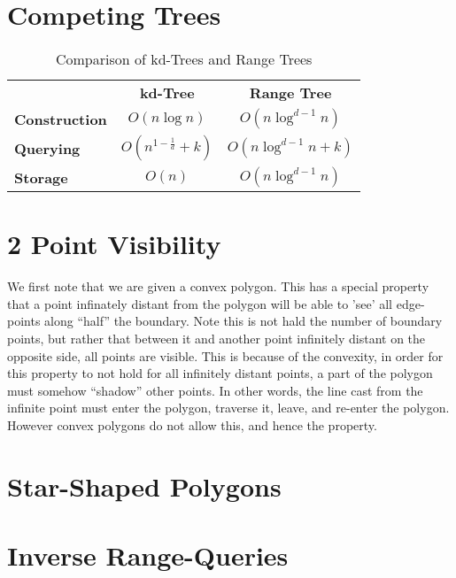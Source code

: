 \section {Competing Trees}
\begin{table}
\caption{Comparison of kd-Trees and Range Trees}
\centering
\begin{tabular}{l c c}
\hline
& \textbf{kd-Tree} & \textbf{Range Tree} \\
\textbf{Construction} & $O(n\log n)$ &  $O(n\log^{d-1}n)$ \\
\textbf{Querying} & $O(n^{1-\frac{1}{d}} + k)$ & $O(n\log^{d-1}n+k)$ \\
\textbf{Storage} & $O(n)$ & $O(n\log^{d-1}n)$ \\
\hline
\end{tabular}
\end{table}

\section {2 Point Visibility}
We first note that we are given a convex polygon.
This has a special property that a point infinately distant from the polygon will be able to 'see' all edge-points along ``half'' the boundary.
Note this is not hald the number of boundary points, but rather that between it and another point infinitely distant on the opposite side, all points are visible.
This is because of the convexity, in order for this property to not hold for all infinitely distant points, a part of the polygon must somehow ``shadow'' other points.
In other words, the line cast from the infinite point must enter the polygon, traverse it, leave, and re-enter the polygon.
However convex polygons do not allow this, and hence the property.

 

\section {Star-Shaped Polygons}

\section {Inverse Range-Queries}


